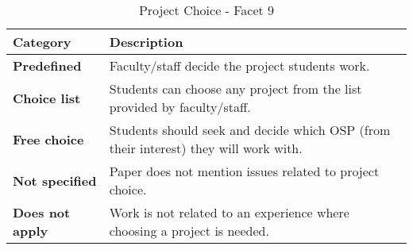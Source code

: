 \begin{table}[hb]
	\centering
	\caption {Project Choice - Facet 9}
    \begin{small}
		{\begin{tabular}{l|p{2.2in}}
			\bf Category & \bf Description  \\
			\hline
			\bf Predefined & Faculty/staff decide the project students work. \\
			\bf Choice list & Students can choose any project from the list provided by faculty/staff. \\
			\bf Free choice & Students should seek and decide which OSP (from their interest) they will work with. \\
			\bf Not specified & Paper does not mention issues related to project choice. \\
			\bf Does not apply & Work is not related to an experience where choosing a project is needed. \\
		\end{tabular}} \label{tab:projectChoice}
    \end{small}
\end{table}
